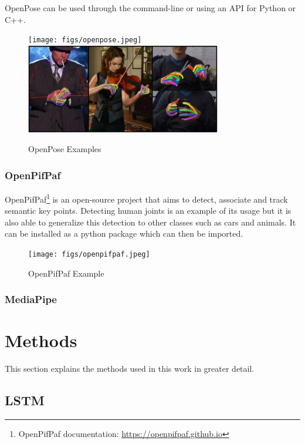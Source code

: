 OpenPose can be used through the command-line or using an API for Python or C++.

\begin{figure}[h]
\centerline{\texttt{[image: figs/openpose.jpeg]}\includegraphics[height=1.55in]{figs/openpose2.PNG}}
\caption[OpenPose Examples]{OpenPose Examples \cite{Cao2021,Simon2017}}
\label{openpose}
\end{figure}

\subsubsection{OpenPifPaf}

OpenPifPaf\cite{Kreiss2021,Kreiss2019}\footnote{OpenPifPaf documentation: \url{https://openpifpaf.github.io}} is an open-source project that aims to detect, associate and track semantic key points. Detecting human joints is an example of its usage but it is also able to generalize this detection to other classes such as cars and animals. It can be installed as a python package which can then be imported.

\begin{figure}[h]
\centerline{\texttt{[image: figs/openpifpaf.jpeg]}}
\caption[OpenPifPaf Example]{OpenPifPaf Example \cite{Kreiss2021}}
\label{openpifpaf}
\end{figure}

\subsubsection{MediaPipe}

\section{Methods}

This section explains the methods used in this work in greater detail.

\subsection{LSTM}

